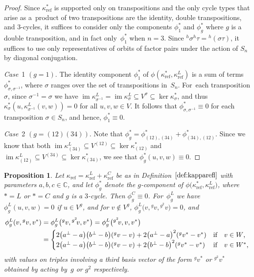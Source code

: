 \documentclass[pdftex]{sigma}
\numberwithin{equation}{section}
\newtheorem{Proposition}[Theorem]{Proposition}
 { \theoremstyle{definition}
\newtheorem{Definition}[Theorem]{Definition}
\newtheorem{Remark}[Theorem]{Remark}
\newtheorem{case}{Case}}
\newcommand{\actby}[1]{{}^{#1}}
\newcommand{\actbylessspace}[1]{{}^{#1}\!}
\DeclareMathOperator{\im}{im}
\DeclareMathOperator{\refl}{ref}
\begin{document}
\begin{proof}
Since $\kappa^{*}_{\refl}$ is supported only on transpositions and the only cycle
types that arise as a~product of two transpositions are the identity, double transpositions,
and $3$-cycles, it suffices to consider only the components $\phi_1^*$ and $\phi_g^*$
where $g$ is a double transposition, and in fact only~$\phi^{*}_1$ when $n=3$.
Since
$\actby{h}\sigma\actby{h}\tau=\actby{h}(\sigma \tau)$, it suffices to use only
representatives of orbits of factor pairs under the action of $S_n$ by diagonal conjugation.
	
\textit{Case}~1 $(g=1)$.
The identity component $\phi^{*}_1$ of $\phi(\kappa^{*}_{\refl},\kappa^L_{\refl})$ is
a sum of terms $\phi^{*}_{\sigma,\sigma^{-1}}$, where $\sigma$ ranges over the set of transpositions in~$S_n$. For~each transposition $\sigma$, since $\sigma^{-1}=\sigma$ we have
$\im\kappa^L_{\sigma^{-1}}=\im\kappa^L_{\sigma}\subseteq V^{\sigma} \subseteq\ker\kappa^{*}_{\sigma}$,
and thus $\kappa^{*}_{\sigma}(u,\kappa^L_{\sigma^{-1}}(v,w))=0$ for all $u,v,w\in V$.
It follows that $\phi^{*}_{\sigma,\sigma^{-1}}\equiv0$ for each transposition $\sigma\in S_n$,
and hence, $\phi^{*}_1\equiv 0$.

\textit{Case}~2 $(g=(12)(34))$.
Note that $\phi^{*}_g=
\phi^{*}_{(12),(34)}+\phi^{*}_{(34),(12)}$.
Since we know that both $\im\kappa^L_{(34)}\subseteq V^{(12)} \subseteq\ker\kappa^{*}_{(12)}$ and
$\im\kappa^L_{(12)}\subseteq V^{(34)} \subseteq\ker\kappa^{*}_{(34)}$, we see
that $\phi^{*}_g(u,v,w)\equiv 0$.
\end{proof}

\begin{Proposition}\label{prop:3-cycle}
Let $\kappa_{\refl}=\kappa^L_{\refl}+\kappa^C_{\refl}$ be as in
Definition~$\ref{def:kapparefl}$ with parameters $a,b,c\in\mathbb{C}$, and let
$\phi_g^{*}$ denote the $g$-component
of $\phi\big(\kappa^*_{\refl},\kappa^L_{\refl}\big)$, where $*=L$
or $*=C$ and $g$ is a $3$-cycle. Then $\phi_g^C\equiv 0$. For~$\phi_g^L$ we have
$\phi_g^L(u,v,w)=0$ if $u\in V^g$,
and for $v \notin V^g$, $\phi_g^L\big(v,\actby{g}v,\actbylessspace{g^2}v\big)=0$, and
\begin{align*} \phi_{g}^L(v,\actby{g}v,v^*)&=\phi_{g}^L\big(\actby{g}v,\actbylessspace{g^2}v,v^*\big)=\phi_{g}^L\big(\actbylessspace{g^2}v,v,v^*\big) \\
&=\begin{cases}
2\big(a^\perp-a\big)\big(b^\perp-b\big)(\actby{g}v-v)+2\big(a^\perp-a\big)^2(\actby{g}v^*-v^*) & \text{if\quad $v \in W$,} \\
2\big(a^\perp-a\big)\big(b^\perp-b\big)(\actby{g}v-v)+2\big(b^\perp-b\big)^2(\actby{g}v^*-v^*) & \text{if\quad $v \in W^*$,}
\end{cases}
\end{align*}
with values on triples involving a third basis vector of the form
$\actby{g}v^*$ or $\actbylessspace{g^2}v^*$ obtained by acting by~$g$ or $g^2$ respectively.
\end{Proposition}
\end{document}
